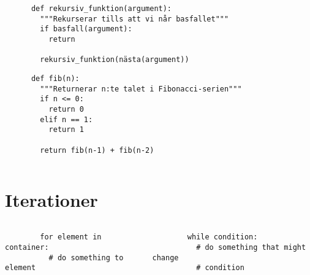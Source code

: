 \begin{frame}[fragile]
  \begin{definition}[Rekursion]
    \begin{verbatim}
      def rekursiv_funktion(argument):
        """Rekurserar tills att vi når basfallet"""
        if basfall(argument):
          return

        rekursiv_funktion(nästa(argument))
    \end{verbatim}
  \end{definition}
\end{frame}

\begin{frame}[fragile]
  \begin{example}[Fibonacci]
    \begin{verbatim}
      def fib(n):
        """Returnerar n:te talet i Fibonacci-serien"""
        if n <= 0:
          return 0
        elif n == 1:
          return 1

        return fib(n-1) + fib(n-2)
    \end{verbatim}
  \end{example}
\end{frame}

\begin{frame}[fragile]
  \begin{example}[Gåexemplet]
    \inputminted[firstline=32]{python}{examples/walk.py}
  \end{example}
\end{frame}


\section{Iterationer}

\begin{frame}[fragile]
  \begin{columns}[t]
    \begin{column}{0.45\columnwidth}
      \begin{verbatim}
        for element in container:
          # do something to element
      \end{verbatim}
    \end{column}
    \begin{column}{0.55\columnwidth}
      \begin{verbatim}
        while condition:
          # do something that might change
          # condition
      \end{verbatim}
    \end{column}
  \end{columns}
\end{frame}

